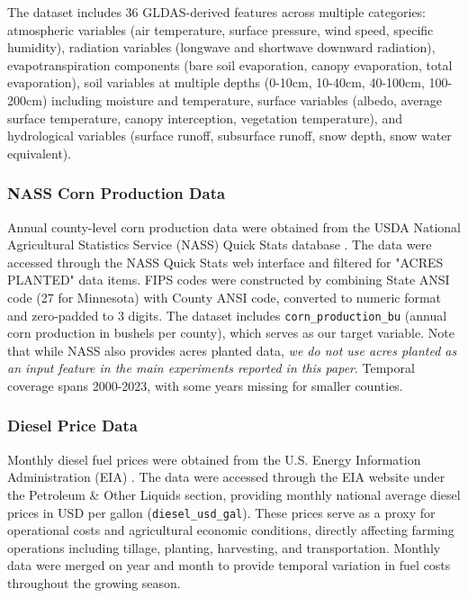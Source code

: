 \documentclass[twocolumn]{article}
\begin{document}
The dataset includes 36 GLDAS-derived features across multiple categories: atmospheric variables (air temperature, surface pressure, wind speed, specific humidity), radiation variables (longwave and shortwave downward radiation), evapotranspiration components (bare soil evaporation, canopy evaporation, total evaporation), soil variables at multiple depths (0-10cm, 10-40cm, 40-100cm, 100-200cm) including moisture and temperature, surface variables (albedo, average surface temperature, canopy interception, vegetation temperature), and hydrological variables (surface runoff, subsurface runoff, snow depth, snow water equivalent).

\subsubsection{NASS Corn Production Data}
Annual county-level corn production data were obtained from the USDA National Agricultural Statistics Service (NASS) Quick Stats database \cite{usda_nass}. The data were accessed through the NASS Quick Stats web interface and filtered for "ACRES PLANTED" data items. FIPS codes were constructed by combining State ANSI code (27 for Minnesota) with County ANSI code, converted to numeric format and zero-padded to 3 digits. The dataset includes \texttt{corn\_production\_bu} (annual corn production in bushels per county), which serves as our target variable. Note that while NASS also provides acres planted data, \textit{we do not use acres planted as an input feature in the main experiments reported in this paper}. Temporal coverage spans 2000-2023, with some years missing for smaller counties.

\subsubsection{Diesel Price Data}
Monthly diesel fuel prices were obtained from the U.S. Energy Information Administration (EIA) \cite{usda_eia}. The data were accessed through the EIA website under the Petroleum \& Other Liquids section, providing monthly national average diesel prices in USD per gallon (\texttt{diesel\_usd\_gal}). These prices serve as a proxy for operational costs and agricultural economic conditions, directly affecting farming operations including tillage, planting, harvesting, and transportation. Monthly data were merged on year and month to provide temporal variation in fuel costs throughout the growing season.
\end{document}
